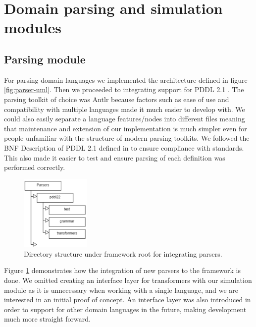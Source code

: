 \section{Domain parsing and simulation modules}
\subsection{Parsing module}
For parsing domain languages we implemented the architecture defined in figure \ref{fig:parser-uml}.
Then we proceeded to integrating support for PDDL 2.1 .
The parsing toolkit of choice was Antlr because factors such as ease of use and compatibility with multiple languages made it much easier to develop with.
We could also easily separate a language features/nodes into different files meaning that maintenance and extension of our implementation is much simpler even for people unfamiliar with the structure of modern parsing toolkits.
We followed the BNF Description of PDDL 2.1 defined in \cite{pddl21:online} to ensure compliance with standards.
This also made it easier to test and ensure parsing of each definition was performed correctly.
\begin{figure}[h]
 \centering
 \includegraphics[width=0.3\textwidth]{images/architecture/parser_dir}
 \caption{Directory structure under framework root for integrating parsers.}
  \label{fig:parser-dir}
\end{figure}
\newline
Figure \ref{fig:parser-dir} demonstrates how the integration of new parsers to the framework is done.
We omitted creating an interface layer for transformers with our simulation module as it is unnecessary when working with a single language, and we are interested in an initial proof of concept.
An interface layer was also introduced in order to support for other domain languages in the future, making development much more straight forward.

